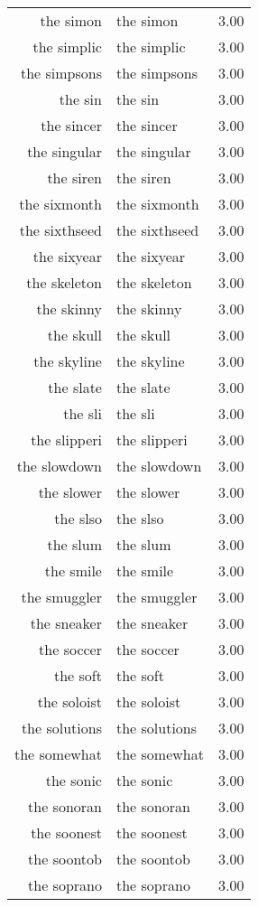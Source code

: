 \begin{table}[ht]
\begin{tabular}{rlr}
  the simon & the simon & 3.00 \\ 
  the simplic & the simplic & 3.00 \\ 
  the simpsons & the simpsons & 3.00 \\ 
  the sin & the sin & 3.00 \\ 
  the sincer & the sincer & 3.00 \\ 
  the singular & the singular & 3.00 \\ 
  the siren & the siren & 3.00 \\ 
  the sixmonth & the sixmonth & 3.00 \\ 
  the sixthseed & the sixthseed & 3.00 \\ 
  the sixyear & the sixyear & 3.00 \\ 
  the skeleton & the skeleton & 3.00 \\ 
  the skinny & the skinny & 3.00 \\ 
  the skull & the skull & 3.00 \\ 
  the skyline & the skyline & 3.00 \\ 
  the slate & the slate & 3.00 \\ 
  the sli & the sli & 3.00 \\ 
  the slipperi & the slipperi & 3.00 \\ 
  the slowdown & the slowdown & 3.00 \\ 
  the slower & the slower & 3.00 \\ 
  the slso & the slso & 3.00 \\ 
  the slum & the slum & 3.00 \\ 
  the smile & the smile & 3.00 \\ 
  the smuggler & the smuggler & 3.00 \\ 
  the sneaker & the sneaker & 3.00 \\ 
  the soccer & the soccer & 3.00 \\ 
  the soft & the soft & 3.00 \\ 
  the soloist & the soloist & 3.00 \\ 
  the solutions & the solutions & 3.00 \\ 
  the somewhat & the somewhat & 3.00 \\ 
  the sonic & the sonic & 3.00 \\ 
  the sonoran & the sonoran & 3.00 \\ 
  the soonest & the soonest & 3.00 \\ 
  the soontob & the soontob & 3.00 \\ 
  the soprano & the soprano & 3.00 \\ 

\end{tabular}
\end{table}
